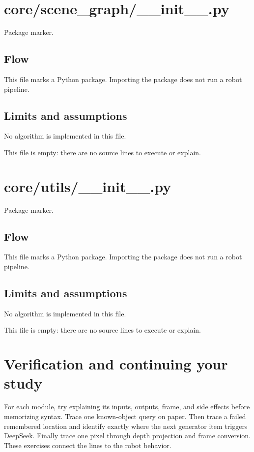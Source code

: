 \documentclass[11pt,a4paper]{book}
\begin{document}
\chapter{core/scene\_graph/\_\_init\_\_.py}

Package marker.

\section*{Flow}

This file marks a Python package. Importing the package does not run a robot pipeline.

\section*{Limits and assumptions}

No algorithm is implemented in this file.

This file is empty: there are no source lines to execute or explain.

\chapter{core/utils/\_\_init\_\_.py}

Package marker.

\section*{Flow}

This file marks a Python package. Importing the package does not run a robot pipeline.

\section*{Limits and assumptions}

No algorithm is implemented in this file.

This file is empty: there are no source lines to execute or explain.

\chapter{Verification and continuing your study}

For each module, try explaining its inputs, outputs, frame, and side effects before memorizing syntax. Trace one known-object query on paper. Then trace a failed remembered location and identify exactly where the next generator item triggers DeepSeek. Finally trace one pixel through depth projection and frame conversion. These exercises connect the lines to the robot behavior.
\end{document}
